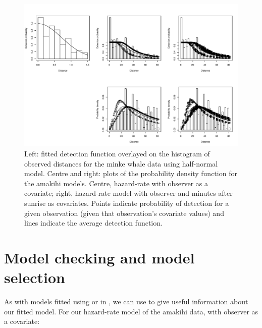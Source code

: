 \documentclass[article,shortnames]{jss}
\begin{document}
\begin{CodeChunk}
\begin{figure}

{\centering \includegraphics{paper_files/figure-latex/minke-amakihi-hn-plot-1} 

}

\caption{Left: fitted detection function overlayed on the histogram of observed distances for the minke whale data using half-normal model. Centre and right: plots of the probability density function for the amakihi models. Centre, hazard-rate with observer as a covariate; right, hazard-rate model with observer and minutes after sunrise as covariates. Points indicate probability of detection for a given observation (given that observation's covariate values) and lines indicate the average detection function.\label{fig:minkeamakihi}}\label{fig:minke-amakihi-hn-plot}
\end{figure}
\end{CodeChunk}

\section{Model checking and model
selection}\label{model-checking-and-model-selection}

As with models fitted using  or  in , we
can use  to give useful information about our fitted
model. For our hazard-rate model of the amakihi data, with observer as a
covariate:
\end{document}
